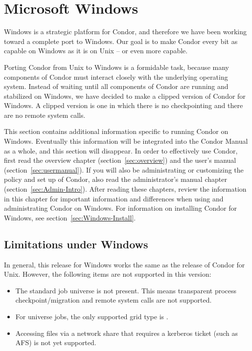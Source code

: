 \section{\label{sec:platform-windows}Microsoft Windows}

Windows is a strategic platform for Condor,
and therefore we have been working toward a complete
port to Windows.
Our goal is to make Condor every bit as capable on Windows as it is on
Unix -- or even more capable.

Porting Condor from Unix to Windows is a formidable task,
because many
components of Condor must interact closely with the underlying operating
system.
Instead of waiting until all components of Condor are running
and stabilized on Windows,
we have decided to make a clipped version of Condor for Windows.
A clipped version is one in which there is no checkpointing
and there are no remote system calls.

This section contains additional information specific to running
Condor on Windows.  Eventually this information will be integrated
into the Condor Manual as a whole, and this section will disappear.
In order to effectively use Condor, first read the overview
chapter (section~\ref{sec:overview})
and the user's manual (section~\ref{sec:usermanual}).
If you will
also be administrating or customizing the policy and set up of Condor,
also read the administrator's manual 
chapter (section~\ref{sec:Admin-Intro}).
After reading these chapters,
review the information in this chapter for
important information and differences when using and administrating
Condor on Windows.
For information on installing Condor for Windows, see
section~\ref{sec:Windows-Install}.



\subsection{Limitations under Windows}

In general, this release for Windows works the same as the 
release of Condor for Unix.
However, the following items are not supported in this version:

\begin{itemize}

\item The standard job universe is not present.  This means
transparent process checkpoint/migration and remote system calls are
not supported.

\item For  universe jobs, the only supported grid type is
.

\item Accessing files via a network share that requires a kerberos ticket
(such as AFS) is not yet supported.

\end{itemize}

